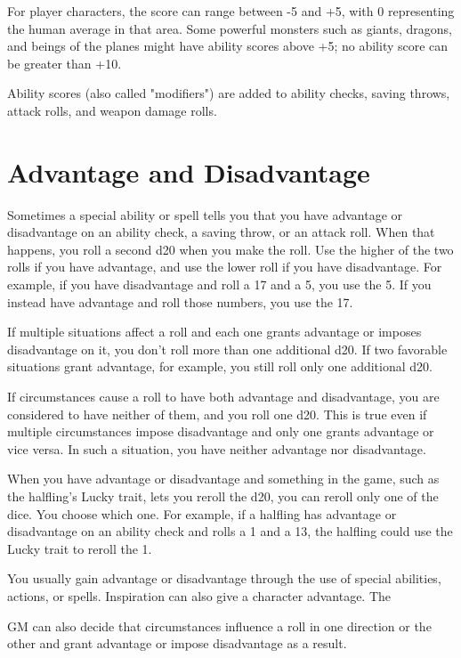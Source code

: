 For player characters, the score can range between -5 and +5, with 0 representing the human average in that area. Some powerful monsters such as giants, dragons, and beings of the planes might have ability scores above +5; no ability score can be greater than +10.

Ability scores (also called "modifiers") are added to ability checks, saving throws, attack rolls, and weapon damage rolls.

\section{Advantage and Disadvantage} \label{sec:advantage-and-disadvantage}

Sometimes a special ability or spell tells you that you have advantage or disadvantage on an ability check, a saving throw, or an attack roll. When that happens, you roll a second d20 when you make the roll. Use the higher of the two rolls if you have advantage, and use the lower roll if you have disadvantage. For example, if you have disadvantage and roll a 17 and a 5, you use the 5. If you instead have advantage and roll those numbers, you use the 17.

If multiple situations affect a roll and each one grants advantage or imposes disadvantage on it, you don't roll more than one additional d20. If two favorable situations grant advantage, for example, you still roll only one additional d20.

If circumstances cause a roll to have both advantage and disadvantage, you are considered to have neither of them, and you roll one d20. This is true even if multiple circumstances impose disadvantage and only one grants advantage or vice versa. In such a situation, you have neither advantage nor disadvantage.

When you have advantage or disadvantage and something in the game, such as the halfling's Lucky trait, lets you reroll the d20, you can reroll only one of the dice. You choose which one. For example, if a halfling has advantage or disadvantage on an ability check and rolls a 1 and a 13, the halfling could use the Lucky trait to reroll the 1.

You usually gain advantage or disadvantage through the use of special abilities, actions, or spells. Inspiration can also give a character advantage. The

GM can also decide that circumstances influence a roll in one direction or the other and grant advantage or impose disadvantage as a result.

